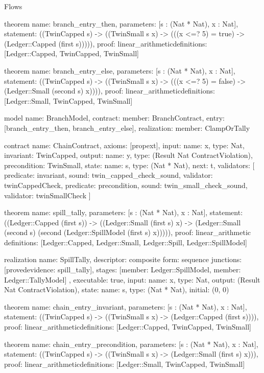 \begin{lexlean}{Flows}
\begin{semanticmodule}
theorem{
  name: branch_entry_then,
  parameters: [s : (Nat * Nat), x : Nat],
  statement: ((TwinCapped s) -> ((TwinSmall s x) -> (((x <=? 5) = true) -> (Ledger::Capped (first s))))),
  proof: linear_arithmetic{definitions: [Ledger::Capped, TwinCapped, TwinSmall]}
}

theorem{
  name: branch_entry_else,
  parameters: [s : (Nat * Nat), x : Nat],
  statement: ((TwinCapped s) -> ((TwinSmall s x) -> (((x <=? 5) = false) -> (Ledger::Small (second s) x)))),
  proof: linear_arithmetic{definitions: [Ledger::Small, TwinCapped, TwinSmall]}
}

model{
  name: BranchModel,
  contract: {member: BranchContract},
  entry: [branch_entry_then, branch_entry_else],
  realization: {member: ClampOrTally}
}

contract{
  name: ChainContract,
  axioms: [propext],
  input: {name: x, type: Nat},
  invariant: TwinCapped,
  output: {name: y, type: (Result Nat ContractViolation)},
  precondition: TwinSmall,
  state: {name: s, type: (Nat * Nat), next: t},
  validators: [
    {predicate: invariant, sound: twin_capped_check_sound, validator: twinCappedCheck},
    {predicate: precondition, sound: twin_small_check_sound, validator: twinSmallCheck}
  ]
}

theorem{
  name: spill_tally,
  parameters: [s : (Nat * Nat), x : Nat],
  statement: ((Ledger::Capped (first s)) -> ((Ledger::Small (first s) x) -> (Ledger::Small (second s) (second (Ledger::SpillModel (first s) x))))),
  proof: linear_arithmetic{
    definitions: [Ledger::Capped, Ledger::Small, Ledger::Spill, Ledger::SpillModel]
  }
}

realization{
  name: SpillTally,
  descriptor: composite{
    form: sequence{
      junctions: [proved{evidence: spill_tally}],
      stages: [{member: Ledger::SpillModel}, {member: Ledger::TallyModel}]
    }
  },
  executable: true,
  input: {name: x, type: Nat},
  output: (Result Nat ContractViolation),
  state: {name: s, type: (Nat * Nat), initial: (0, 0)}
}

theorem{
  name: chain_entry_invariant,
  parameters: [s : (Nat * Nat), x : Nat],
  statement: ((TwinCapped s) -> ((TwinSmall s x) -> (Ledger::Capped (first s)))),
  proof: linear_arithmetic{definitions: [Ledger::Capped, TwinCapped, TwinSmall]}
}

theorem{
  name: chain_entry_precondition,
  parameters: [s : (Nat * Nat), x : Nat],
  statement: ((TwinCapped s) -> ((TwinSmall s x) -> (Ledger::Small (first s) x))),
  proof: linear_arithmetic{definitions: [Ledger::Small, TwinCapped, TwinSmall]}
}


\end{semanticmodule}
\end{lexlean}
